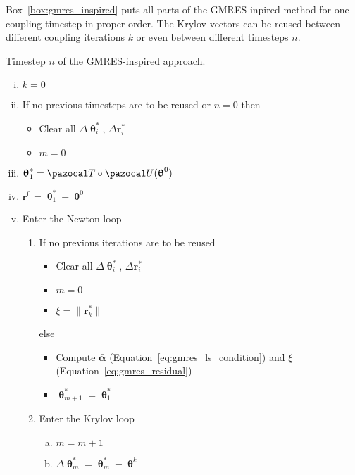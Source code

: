 Box~\ref{box:gmres_inspired} puts all parts of the GMRES-inpired method for one coupling timestep in proper order. The Krylov-vectors can be reused between different coupling iterations $k$ or even between different timesteps $n$.

\begin{framedbox}[htbp]
  \caption{Timestep \(n\) of the GMRES-inspired approach.}
  \label{box:gmres_inspired}
  \begin{center}
    \begin{minipage}{0.9\textwidth}
    \begin{enumerate}[(i)]
    \item \(k=0\)
    \item If no previous timesteps are to be reused or \(n=0\) then
    \begin{itemize}
      \item Clear all \(\Delta \bm \uptheta^*_i\), \(\Delta \mathbf r^*_i\)
      \item \(m=0\)
    \end{itemize}
    \item \(\bm \uptheta^*_1 = \pazocal T\circ \pazocal U(\bm \uptheta^0)\)
    \item \(\mathbf r^0 = \bm \uptheta^*_1 - \bm \uptheta^0\)
    \item Enter the Newton loop
    \begin{enumerate}[(1)]
      \item If no previous iterations are to be reused
      \begin{itemize}
        \item Clear all \(\Delta \bm\uptheta^*_i\), \(\Delta \mathbf r^*_i\)
        \item \(m=0\)
        \item \(\xi = \|\mathbf r^*_k\|\)
      \end{itemize}
      else
      \begin{itemize}
        \item Compute \(\bar{\mathbf\alpha}\) (Equation~\eqref{eq:gmres_ls_condition}) and \(\xi\) (Equation~\eqref{eq:gmres_residual})
        \item \(\bm \uptheta^*_{m+1} = \bm \uptheta^*_1\)
      \end{itemize}
      \item Enter the Krylov loop
      \begin{enumerate}[(a)]
        \item \(m=m+1\)
        \item \(\Delta \bm\uptheta^*_m = \bm\uptheta^*_m - \bm\uptheta^k\)

\end{enumerate}
\end{enumerate}
\end{enumerate}
\end{minipage}
\end{center}
\end{framedbox}
